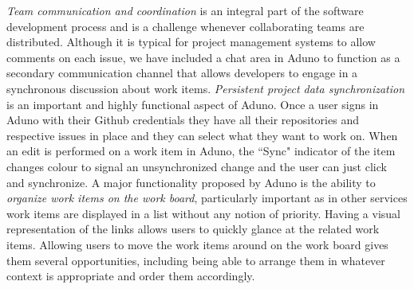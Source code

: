\documentclass[conference]{IEEEtran}
\begin{document}
%
\textit{Team communication and coordination} is an integral part of the software development process and is a challenge whenever collaborating teams are distributed. Although it is typical for project management systems to allow comments on each issue, we have included a chat area in Aduno to function as a secondary communication channel that allows developers to engage in a synchronous discussion about work items. \textit{Persistent project data synchronization} is an important and highly functional aspect of Aduno.  Once a user signs in Aduno with their Github credentials they have all their repositories and respective issues in place and they can select what they want to work on. When an edit is performed on a work item in Aduno, the ``Sync" indicator of the item changes colour to signal an unsynchronized change and the user can just click and synchronize. A major functionality proposed by Aduno is the ability to \textit{organize work items on the work board}, particularly important as in other services work items are displayed in a list without any notion of priority. Having a visual representation of the links allows users to quickly glance at the related work items. Allowing users to move the work items around on the work board gives them several opportunities, including being able to arrange them in whatever context is appropriate and order them accordingly. %
%
%
\end{document}
